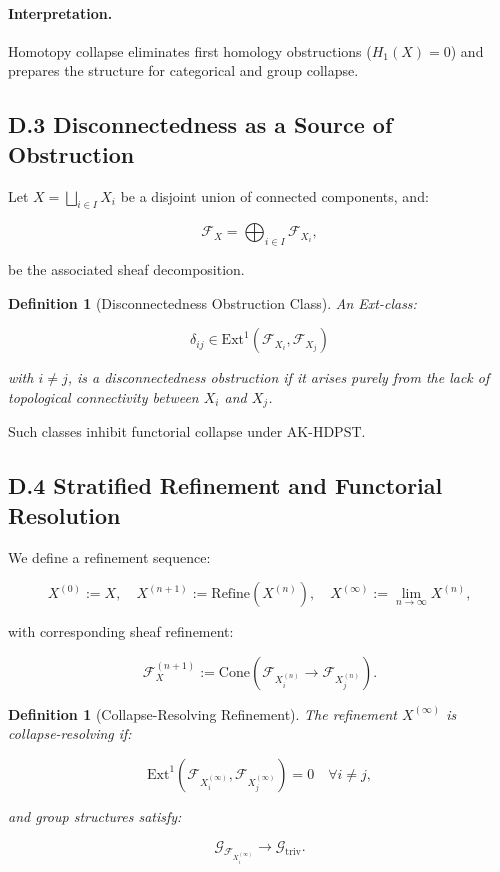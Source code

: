 \documentclass[11pt]{article}
\newtheorem{definition}[theorem]{Definition}
\begin{document}
\paragraph{Interpretation.}
Homotopy collapse eliminates first homology obstructions (\( H_1(X) = 0 \)) and prepares the structure for categorical and group collapse.

\subsection*{D.3 Disconnectedness as a Source of Obstruction}

Let \( X = \bigsqcup_{i \in I} X_i \) be a disjoint union of connected components, and:

\[
\mathcal{F}_X = \bigoplus_{i \in I} \mathcal{F}_{X_i},
\]

be the associated sheaf decomposition.

\begin{definition}[Disconnectedness Obstruction Class]
An Ext-class:

\[
\delta_{ij} \in \mathrm{Ext}^1(\mathcal{F}_{X_i}, \mathcal{F}_{X_j})
\]

with \( i \neq j \), is a \emph{disconnectedness obstruction} if it arises purely from the lack of topological connectivity between \( X_i \) and \( X_j \).
\end{definition}

Such classes inhibit functorial collapse under AK-HDPST.

\subsection*{D.4 Stratified Refinement and Functorial Resolution}

We define a refinement sequence:

\[
X^{(0)} := X, \quad X^{(n+1)} := \mathrm{Refine}(X^{(n)}), \quad X^{(\infty)} := \lim_{n \to \infty} X^{(n)},
\]

with corresponding sheaf refinement:

\[
\mathcal{F}_X^{(n+1)} := \mathrm{Cone}(\mathcal{F}_{X^{(n)}_i} \to \mathcal{F}_{X^{(n)}_j}).
\]

\begin{definition}[Collapse-Resolving Refinement]
The refinement \( X^{(\infty)} \) is \emph{collapse-resolving} if:

\[
\mathrm{Ext}^1(\mathcal{F}_{X^{(\infty)}_i}, \mathcal{F}_{X^{(\infty)}_j}) = 0 \quad \forall i \neq j,
\]

and group structures satisfy:

\[
\mathcal{G}_{\mathcal{F}_{X^{(\infty)}_i}} \longrightarrow \mathcal{G}_{\mathrm{triv}}.
\]
\end{definition}
\end{document}
